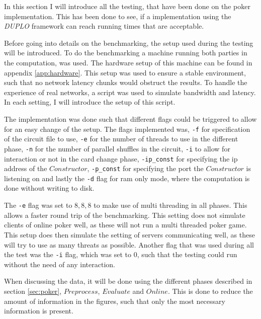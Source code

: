 \documentclass[twoside,11pt,openright]{report}
\newcommand{\DUPLO}{\textit{DUPLO} }
\begin{document}
In this section I will introduce all the testing, that have been done on the poker implementation. This has been done to see, if a implementation using the \DUPLO framework can reach running times that are acceptable. 

Before going into details on the benchmarking, the setup used during the testing will be introduced. To do the benchmarking a machine running both parties in the computation, was used. The hardware setup of this machine can be found in appendix \ref{app:hardware}. This setup was used to ensure a stable environment, such that no network latency chunks would obstruct the results. To handle the experience of real networks, a script was used to simulate bandwidth and latency. In each setting, I will introduce the setup of this script. 

\bigskip

The implementation was done such that different flags could be triggered to allow for an easy change of the setup. The flags implemented was, \verb|-f| for specification of the circuit file to use, \verb|-e| for the number of threads to use in the different phase, \verb|-n| for the number of parallel shuffles in the circuit, \verb|-i| to allow for interaction or not in the card change phase, \verb|-ip_const| for specifying the ip address of the $Constructor$, \verb|-p_const| for specifying the port the $Constructor$ is listening on and lastly the \verb|-d| flag for ram only mode, where the computation is done without writing  to disk.

The \verb|-e| flag was set to $8,8,8$ to make use of multi threading in all phases. This allows a faster round trip of the benchmarking. This setting does not simulate clients of online poker well, as these will not run a multi threaded poker game. This setup does then simulate the setting of servers communicating well, as these will try to use as many threats as possible. Another flag that was used during all the test was the \verb|-i| flag, which was set to $0$, such that the testing could run without the need of any interaction.

When discussing the data, it will be done using the different phases described in section \ref{sec:poker}, $Preprocess$, $Evaluate$ and $Online$. This is done to reduce the amount of information in the figures, such that only the most necessary information is present.

\bigskip
\end{document}

